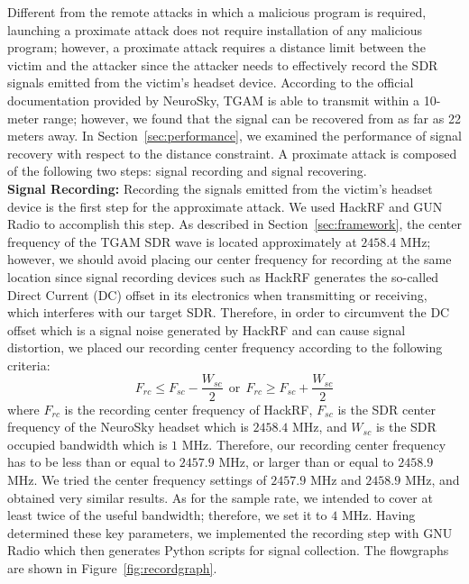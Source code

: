 Different from the remote attacks in which a malicious program is required, launching a proximate attack does not require installation of any malicious program; however, a proximate attack requires a distance limit between the victim and the attacker since the attacker needs to effectively record the SDR signals emitted from the victim's headset device. According to the official documentation provided by NeuroSky, TGAM is able to transmit within a 10-meter range; however, we found that the signal can be recovered from as far as 22 meters away. In Section~\ref{sec:performance}, we examined the performance of signal recovery with respect to the distance constraint. A proximate attack is composed of the following two steps: signal recording and signal recovering.\\
%
\indent \textbf{Signal Recording:} Recording the signals emitted from the victim's headset device is the first step for the approximate attack. We used HackRF and GUN Radio to accomplish this step. As described in Section~\ref{sec:framework}, the center frequency of the TGAM SDR wave is located approximately at $2458.4$ MHz; however, we should avoid placing our center frequency for recording at the same location since signal recording devices such as HackRF generates the so-called Direct Current (DC) offset in its electronics when transmitting or receiving, which interferes with our target SDR. Therefore, in order to circumvent the DC offset which is a signal noise generated by HackRF and can cause signal distortion, we placed our recording center frequency according to the following criteria:
\begin{equation}
F_{rc} \leq F_{sc} - \frac{W_{sc}}{2}\ \ \mbox{or}\ \ F_{rc} \geq F_{sc} + \frac{W_{sc}}{2}
\end{equation}
where $F_{rc}$ is the recording center frequency of HackRF, $F_{sc}$ is the SDR center frequency of the NeuroSky headset which is $2458.4$ MHz, and $W_{sc}$ is the SDR occupied bandwidth which is $1$ MHz. Therefore, our recording center frequency has to be less than or equal to $2457.9$ MHz, or larger than or equal to $2458.9$ MHz. We tried the center frequency settings of $2457.9$ MHz and $2458.9$ MHz, and obtained very similar results. As for the sample rate, we intended to cover at least twice of the useful bandwidth; therefore, we set it to $4$ MHz. Having determined these key parameters, we implemented the recording step with GNU Radio which then generates Python scripts for signal collection. The flowgraphs are shown in Figure~\ref{fig:recordgraph}.\\
